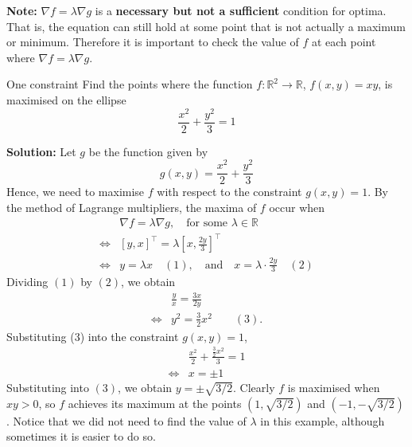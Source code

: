 \documentclass[11pt]{article}
\newcommand{\R}{\mathbb{R}}
\begin{document}
\smallskip
	\noindent \textbf{Note:} \( \nabla f = \lambda\nabla g \) is a \textbf{necessary but not a sufficient} condition for optima. That is, the equation can still hold at some point that is not actually a maximum or minimum. Therefore it is important to check the value of \( f \) at each point where \( \nabla f = \lambda\nabla g \).
	
	\begin{example}{One constraint}{}
			Find the points where the function \( f:\R^2\to\R \), \( f(x, y) = xy \), is maximised on the ellipse
			\[	\frac{x^2}{2} + \frac{y^2}{3} = 1
			\]
		\end{example}
	\noindent \textbf{Solution:} Let \( g \) be the function given by
	\[	g(x, y) = \frac{x^2}{2} + \frac{y^2}{3}
	\]
	Hence, we need to maximise \( f \) with respect to the constraint \( g(x,y) = 1 \).
	By the method of Lagrange multipliers, the maxima of \( f \) occur when 
	\begin{align*}
		     &\nabla f = \lambda\nabla g, \quad\text{for some }\lambda\in\R\\
		\iff & \left[y, x\right]^{\top} = \lambda \left[x, \frac{2y}{3}\right]^{\top} \\
		\iff & y = \lambda x\quad (1), \quad\text{and}\quad x = \lambda\cdot\frac{2y}{3} \quad (2)
	\end{align*}
	Dividing \( (1) \) by \( (2) \), we obtain
	\begin{align*}
		 	 & \frac{y}{x} = \frac{3x}{2y} \\
		\iff & y^2 = \frac{3}{2}x^2\qquad (3).
	\end{align*}
	Substituting (3) into the constraint \( g(x,y) = 1 \), 
	\begin{align*}
			 & \frac{x^2}{2} + \frac{\frac{3}{2} x^2}{3} = 1 \\
		\iff & x = \pm 1
	\end{align*}
	Substituting into \( (3) \), we obtain \( y = \pm\sqrt{3/2} \). Clearly \( f \) is maximised when \( xy >0 \), so \( f \) achieves its maximum at the points \( (1, \sqrt{3/2}) \) and \((-1, -\sqrt{3/2})  \). Notice that we did not need to find the value of \( \lambda \) in this example, although sometimes it is easier to do so.\\\\
\end{document}
